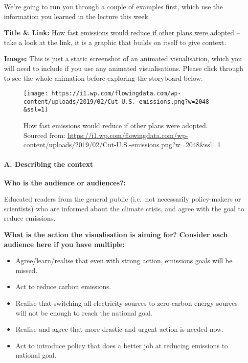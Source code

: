 \documentclass[]{article}
\providecommand{\tightlist}{%
  \setlength{\itemsep}{0pt}\setlength{\parskip}{0pt}}
\let\oldparagraph\paragraph
\renewcommand{\paragraph}[1]{\oldparagraph{#1}\mbox{}}
\begin{document}
We're going to run you through a couple of examples first, which use the
information you learned in the lecture this week.

\textbf{Title \& Link:}
\href{https://www.nytimes.com/interactive/2019/02/13/climate/cut-us-emissions-with-policies-from-other-countries.html}{How
fast emissions would reduce if other plans were adopted} -- take a look
at the link, it is a graphic that builds on itself to give context.

\textbf{Image:} This is just a static screenshot of an animated
visualisation, which you will need to include if you use any animated
visualisations. Please click through to see the whole animation before
exploring the storyboard below.

\begin{figure}
\centering
\texttt{[image: https://i1.wp.com/flowingdata.com/wp-content/uploads/2019/02/Cut-U.S.-emissions.png?w=2048\\\&ssl=1]}
\caption{How fast emissions would reduce if other plans were adopted.
Sourced from:
\url{https://i1.wp.com/flowingdata.com/wp-content/uploads/2019/02/Cut-U.S.-emissions.png?w=2048\&ssl=1}}
\end{figure}

\paragraph{A. Describing the context}\label{a.-describing-the-context}

\textbf{Who is the audience or audiences?: }

Educated readers from the general public (i.e.~not necessarily
policy-makers or scientists) who are informed about the climate crisis,
and agree with the goal to reduce emissions.

\textbf{What is the action the visualisation is aiming for? Consider
each audience here if you have multiple:}

\begin{itemize}
\tightlist
\item
  Agree/learn/realise that even with strong action, emissions goals will
  be missed.
\item
  Act to reduce carbon emissions.
\item
  Realise that switching all electricity sources to zero-carbon energy
  sources will not be enough to reach the national goal.\\
\item
  Realise and agree that more drastic and urgent action is needed now.\\
\item
  Act to introduce policy that does a better job at reducing emissions
  to national goal.
\end{itemize}
\end{document}
